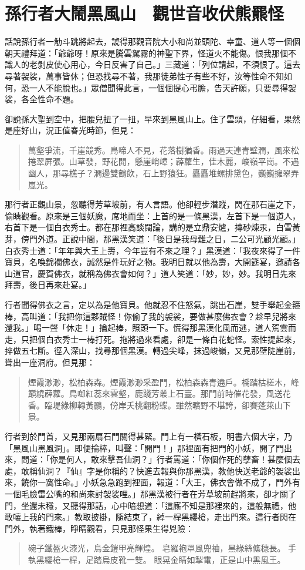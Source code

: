 
\chapter{孫行者大鬧黑風山　觀世音收伏熊羆怪}

話說孫行者一觔斗跳將起去，諕得那觀音院大小和尚並頭陀、幸童、道人等一個個朝天禮拜道：「爺爺呀！原來是騰雲駕霧的神聖下界，怪道火不能傷。恨我那個不識人的老剝皮使心用心，今日反害了自己。」三藏道：「列位請起，不須恨了。這去尋著袈裟，萬事皆休；但恐找尋不著，我那徒弟性子有些不好，汝等性命不知如何，恐一人不能脫也。」眾僧聞得此言，一個個提心弔膽，告天許願，只要尋得袈裟，各全性命不題。

卻說孫大聖到空中，把腰兒扭了一扭，早來到黑風山上。住了雲頭，仔細看，果然是座好山，況正值春光時節，但見：
\begin{quote}
萬壑爭流，千崖競秀。鳥啼人不見，花落樹猶香。雨過天連青壁潤，風來松捲翠屏張。山草發，野花開，懸崖峭嶂；薜蘿生，佳木麗，峻嶺平崗。不遇幽人，那尋樵子？澗邊雙鶴飲，石上野猿狂。矗矗堆螺排黛色，巍巍擁翠弄嵐光。
\end{quote}

那行者正觀山景，忽聽得芳草坡前，有人言語。他卻輕步潛蹤，閃在那石崖之下，偷睛觀看。原來是三個妖魔，席地而坐：上首的是一條黑漢，左首下是一個道人，右首下是一個白衣秀士。都在那裡高談闊論，講的是立鼎安爐，摶砂煉汞，白雪黃芽，傍門外道。正說中間，那黑漢笑道：「後日是我母難之日，二公可光顧光顧。」白衣秀士道：「年年與大王上壽，今年豈有不來之理？」黑漢道：「我夜來得了一件寶貝，名喚錦襴佛衣，誠然是件玩好之物。我明日就以他為壽，大開筵宴，邀請各山道官，慶賀佛衣，就稱為佛衣會如何？」道人笑道：「妙，妙，妙。我明日先來拜壽，後日再來赴宴。」

行者聞得佛衣之言，定以為是他寶貝。他就忍不住怒氣，跳出石崖，雙手舉起金箍棒，高叫道：「我把你這夥賊怪！你偷了我的袈裟，要做甚麼佛衣會？趁早兒將來還我。」喝一聲「休走！」掄起棒，照頭一下。慌得那黑漢化風而逃，道人駕雲而走，只把個白衣秀士一棒打死。拖將過來看處，卻是一條白花蛇怪。索性提起來，捽做五七斷。徑入深山，找尋那個黑漢。轉過尖峰，抹過峻嶺，又見那壁陡崖前，聳出一座洞府。但見那：
\begin{quote}
煙霞渺渺，松柏森森。煙霞渺渺采盈門，松柏森森青遶戶。橋踏枯槎木，峰巔繞薜蘿。鳥啣紅蕊來雲壑，鹿踐芳叢上石臺。那門前時催花發，風送花香。臨堤綠柳轉黃鸝，傍岸夭桃翻粉蝶。雖然曠野不堪誇，卻賽蓬萊山下景。
\end{quote}

行者到於門首，又見那兩扇石門關得甚緊。門上有一橫石板，明書六個大字，乃「黑風山黑風洞」。即便掄棒，叫聲：「開門！」那裡面有把門的小妖，開了門出來，問道：「你是何人，敢來擊吾仙洞？」行者罵道：「你個作死的孽畜！甚麼個去處，敢稱仙洞？『仙』字是你稱的？快進去報與你那黑漢，教他快送老爺的袈裟出來，饒你一窩性命。」小妖急急跑到裡面，報道：「大王，佛衣會做不成了，門外有一個毛臉雷公嘴的和尚來討袈裟哩。」那黑漢被行者在芳草坡前趕將來，卻才關了門，坐還未穩，又聽得那話，心中暗想道：「這廝不知是那裡來的，這般無禮，他敢嚷上我的門來。」教取披掛，隨結束了，綽一桿黑纓槍，走出門來。這行者閃在門外，執著鐵棒，睜睛觀看，只見那怪果生得兇險：
\begin{quote}
碗子鐵盔火漆光，烏金鎧甲亮輝煌。
皂羅袍罩風兜袖，黑綠絲絛穗長。
手執黑纓槍一桿，足踏烏皮靴一雙。
眼晃金睛如掣電，正是山中黑風王。
\end{quote}

